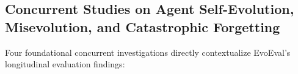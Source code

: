 
\subsection{Concurrent Studies on Agent Self-Evolution, Misevolution, and Catastrophic Forgetting}
\label{sec:concurrent_studies}

Four foundational concurrent investigations directly contextualize EvoEval's longitudinal evaluation findings:

